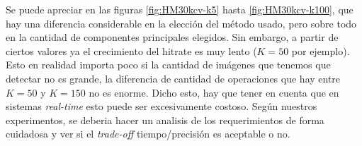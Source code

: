 Se puede apreciar en las figuras \ref{fig:HM30kcv-k5} hasta \ref{fig:HM30kcv-k100},
que hay una diferencia considerable en la elecci\'on del m\'etodo usado,
pero sobre todo en la cantidad de componentes principales elegidos. Sin embargo, a partir de ciertos valores
ya el crecimiento del hitrate es muy lento ($K=50$ por ejemplo). Esto en realidad importa poco
si la cantidad de im\'agenes que tenemos que detectar no es grande, la diferencia de cantidad
de operaciones que hay entre $K=50$ y $K=150$ no es enorme. Dicho esto, hay que tener en cuenta que
en sistemas \textit{real-time} esto puede ser excesivamente costoso. Seg\'un nuestros experimentos,
se deberia hacer un analisis de los requerimientos de forma cuidadosa y ver si el \textit{trade-off} tiempo/precisi\'on
es aceptable o no.
